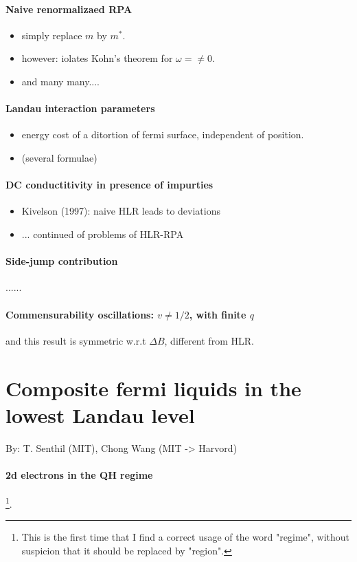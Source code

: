 \documentclass{article}
\numberwithin{equation}{subsection} %
\theoremstyle{definition}
\begin{document}
\paragraph{Naive renormalizaed RPA}
\begin{itemize}
    \item simply replace $m$ by $m^*$.
    \item however: iolates Kohn's theorem for $\omega=\neq 0$.
    \item and many many....
\end{itemize}
\paragraph{Landau interaction parameters}
\begin{itemize}
    \item energy cost of a ditortion of fermi surface, independent of
        position.
    \item (several formulae)
\end{itemize}
\paragraph{DC conductitivity in presence of impurties}
\begin{itemize}
    \item Kivelson (1997): naive HLR leads to deviations
    \item ... continued of problems of HLR-RPA
\end{itemize}
\paragraph{Side-jump contribution} ......
\paragraph{Commensurability oscillations: $v\neq 1/2$, with finite $q$}
and this result is symmetric w.r.t $\Delta B$, different from HLR.

\section{Composite fermi liquids in the lowest Landau level}
\label{sec:Composite-fermi-liquids-in-the-lowest-Landau-level}
By: T. Senthil (MIT), Chong Wang (MIT -> Harvord)

\paragraph{2d electrons in the QH regime}
\footnote{This is the first time that I find a correct usage of the word
"regime", without suspicion that it should be replaced by "region".}.
\end{document}
